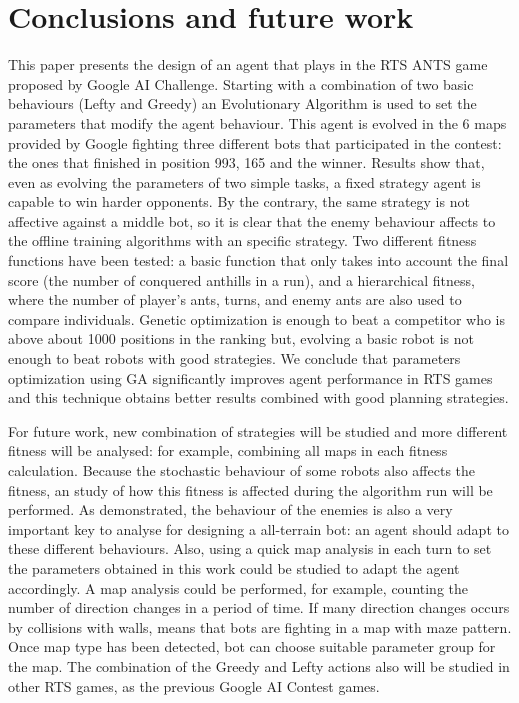 \documentclass[runningheads]{llncs}
\begin{document}



\section{Conclusions and future work}

This paper presents the design of an agent that plays in the RTS ANTS game proposed by Google AI Challenge. Starting with a combination of two basic behaviours (Lefty and Greedy) an Evolutionary Algorithm is used to set the parameters that modify the agent behaviour. This agent is evolved in the 6 maps provided by Google fighting three different bots that participated in the contest: the ones that finished in position 993, 165 and the winner. Results show that, even as evolving the parameters of two simple tasks, a fixed strategy agent is capable to win harder opponents. By the contrary, the same strategy is not affective against a middle bot, so it is clear that the enemy behaviour affects to the offline training algorithms with an specific strategy. Two different fitness functions have been tested: a basic function that only takes into account the final score (the number of conquered anthills in a run), and a hierarchical fitness, where the number of player's ants, turns, and enemy ants are also used to compare individuals. Genetic optimization is enough to beat a competitor who is above about 1000 positions in the ranking but, evolving a basic robot is not enough to beat robots with good strategies. We conclude that parameters optimization using GA significantly improves agent performance in RTS games and this technique obtains better results combined with good planning strategies.

For future work, new combination of strategies will be studied and more different fitness will be analysed: for example, combining all maps in each fitness calculation. Because the stochastic behaviour of some robots also affects the fitness, an study of how this fitness is affected during the algorithm run will be performed. As demonstrated, the behaviour of the enemies is also a very important key to analyse for designing a all-terrain bot: an agent should adapt to these different behaviours. Also, using a quick map analysis in each turn to set the parameters obtained in this work could be studied to adapt the agent accordingly. A map analysis could be performed, for example, counting the number of
direction changes in a period of time. If many direction changes occurs by collisions with walls, means that bots are fighting in a map with maze pattern. Once map type has been detected, bot can choose suitable parameter group for the map. The combination of the Greedy and Lefty actions also will be studied in other RTS games, as the previous Google AI Contest games.



\end{document}
